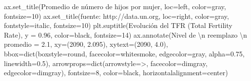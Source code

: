 \documentclass[
  letterpaper,
  DIV=11,
  numbers=noendperiod]{scrreprt}
\newenvironment{Shaded}{\begin{snugshade}}{\end{snugshade}}
\newcommand{\BuiltInTok}[1]{\textcolor[rgb]{0.00,0.23,0.31}{#1}}
\newcommand{\CharTok}[1]{\textcolor[rgb]{0.13,0.47,0.30}{#1}}
\newcommand{\DecValTok}[1]{\textcolor[rgb]{0.68,0.00,0.00}{#1}}
\newcommand{\FloatTok}[1]{\textcolor[rgb]{0.68,0.00,0.00}{#1}}
\newcommand{\NormalTok}[1]{\textcolor[rgb]{0.00,0.23,0.31}{#1}}
\newcommand{\OperatorTok}[1]{\textcolor[rgb]{0.37,0.37,0.37}{#1}}
\newcommand{\StringTok}[1]{\textcolor[rgb]{0.13,0.47,0.30}{#1}}
\begin{document}
\begin{Shaded}
\begin{Highlighting}[]
\NormalTok{ax.set\_title(}\StringTok{\textquotesingle{}Promedio de número de hijos por mujer\textquotesingle{}}\NormalTok{, loc}\OperatorTok{=}\StringTok{\textquotesingle{}left\textquotesingle{}}\NormalTok{, color}\OperatorTok{=}\StringTok{\textquotesingle{}gray\textquotesingle{}}\NormalTok{, fontsize}\OperatorTok{=}\DecValTok{10}\NormalTok{)}
\NormalTok{ax.set\_title(}\StringTok{\textquotesingle{}fuente: http://data.un.org\textquotesingle{}}\NormalTok{, loc}\OperatorTok{=}\StringTok{\textquotesingle{}right\textquotesingle{}}\NormalTok{, color}\OperatorTok{=}\StringTok{\textquotesingle{}gray\textquotesingle{}}\NormalTok{, fontstyle}\OperatorTok{=}\StringTok{\textquotesingle{}italic\textquotesingle{}}\NormalTok{, fontsize}\OperatorTok{=}\DecValTok{10}\NormalTok{)}
\NormalTok{plt.suptitle(}\StringTok{\textquotesingle{}Evolución del TFR (Total Fertility Rate)\textquotesingle{}}\NormalTok{, y }\OperatorTok{=} \FloatTok{0.96}\NormalTok{, color}\OperatorTok{=}\StringTok{\textquotesingle{}black\textquotesingle{}}\NormalTok{, fontsize}\OperatorTok{=}\DecValTok{14}\NormalTok{)}
\NormalTok{ax.annotate(}\StringTok{\textquotesingle{}Nivel de }\CharTok{\textbackslash{}n}\StringTok{ reemplazo }\CharTok{\textbackslash{}n}\StringTok{ promedio = 2.1\textquotesingle{}}\NormalTok{, }
\NormalTok{             xy}\OperatorTok{=}\NormalTok{(}\DecValTok{2090}\NormalTok{, }\FloatTok{2.095}\NormalTok{), xytext}\OperatorTok{=}\NormalTok{(}\DecValTok{2090}\NormalTok{, }\FloatTok{4.0}\NormalTok{),}
\NormalTok{             bbox}\OperatorTok{=}\BuiltInTok{dict}\NormalTok{(boxstyle}\OperatorTok{=}\StringTok{\textquotesingle{}round\textquotesingle{}}\NormalTok{, facecolor}\OperatorTok{=}\StringTok{\textquotesingle{}whitesmoke\textquotesingle{}}\NormalTok{, edgecolor}\OperatorTok{=}\StringTok{\textquotesingle{}gray\textquotesingle{}}\NormalTok{, alpha}\OperatorTok{=}\FloatTok{0.75}\NormalTok{, linewidth}\OperatorTok{=}\FloatTok{0.5}\NormalTok{),}
\NormalTok{             arrowprops}\OperatorTok{=}\BuiltInTok{dict}\NormalTok{(arrowstyle}\OperatorTok{=}\StringTok{\textquotesingle{}{-}\textgreater{}\textquotesingle{}}\NormalTok{, facecolor}\OperatorTok{=}\StringTok{\textquotesingle{}dimgray\textquotesingle{}}\NormalTok{, edgecolor}\OperatorTok{=}\StringTok{\textquotesingle{}dimgray\textquotesingle{}}\NormalTok{),}
\NormalTok{             fontsize}\OperatorTok{=}\DecValTok{8}\NormalTok{, color}\OperatorTok{=}\StringTok{\textquotesingle{}black\textquotesingle{}}\NormalTok{, horizontalalignment}\OperatorTok{=}\StringTok{\textquotesingle{}center\textquotesingle{}}\NormalTok{)}


\end{Highlighting}
\end{Shaded}
\end{document}
